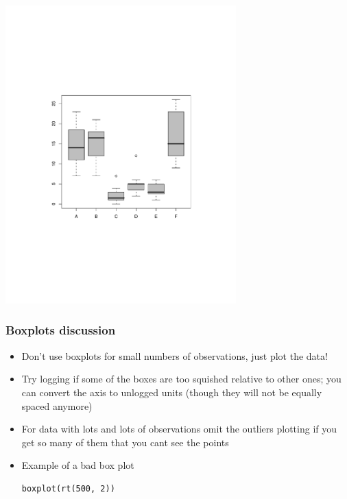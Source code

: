 \documentclass[aspectratio=169]{beamer}
\begin{document}
\begin{frame}
\includegraphics[width=3.5in]{boxplot.pdf}
\end{frame}

\begin{frame}[fragile]\frametitle{Boxplots discussion}
\begin{itemize}
\item Don't use boxplots for small numbers of observations, just plot the data!
\item Try logging if some of the boxes are too squished relative to other ones;
  you can convert the axis to unlogged units (though they will not be equally spaced
  anymore)
\item For data with lots and lots of observations omit the outliers
  plotting if you get so many of them that you cant see the points
\item Example of a bad box plot
\begin{verbatim}
boxplot(rt(500, 2))
\end{verbatim}
\end{itemize}
\end{frame}
\end{document}
